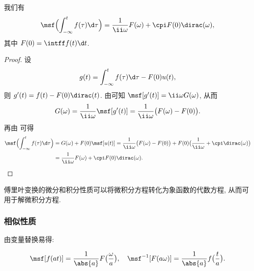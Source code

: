 \begin{theorem}[积分性质]
  \label{thm:fourier-integral-property}
  我们有
  \[
    \msf\Bigl(\int_{-\infty}^t f(\tau)\d\tau\Bigr)
    =\frac1{\ii \omega}F(\omega)+\cpi F(0)\dirac(\omega),
  \]
  其中 $F(0)=\intff f(t)\d t$.
\end{theorem}

\begin{proof}
  设
  \[
    g(t)=\int_{-\infty}^t f(\tau)\d \tau-F(0)u(t),
  \]
  则 $g'(t)=f(t)-F(0)\dirac(t)$.
  由\thmFDif 可知 $\msf[g'(t)]=\ii \omega G(\omega)$, 从而
  \[
    G(\omega)=\frac1{\ii \omega}\msf[g'(t)]
    =\frac1{\ii \omega}\bigl(F(\omega)-F(0)\bigr).
  \]
  再由 可得
  \begin{align*}
    \msf\Bigl(\int_{-\infty}^t f(\tau)\d\tau\Bigr)
    &=G(\omega)+F(0)\msf[u(t)]
    =\frac1{\ii \omega}\bigl(F(\omega)-F(0)\bigr)+F(0)\bigl(\frac1{\ii \omega}+\cpi\dirac(\omega)\bigr)\\
    &=\frac1{\ii \omega}F(\omega)+\cpi F(0)\dirac(\omega).\qedhere
  \end{align*}
\end{proof}

傅里叶变换的微分和积分性质可以将微积分方程转化为象函数的代数方程, 从而可用于解微积分方程.


\subsubsection{相似性质}

由变量替换易得:
\begin{theorem}[相似性质]
  \label{thm:fourier-similar-property}
  \[
    \msf[f(at)]=\frac1{\abs{a}}F\bigl(\frac\omega a\bigr),\quad
    \msf^{-1}[F(a\omega)]=\frac1{\abs{a}}f\bigl(\frac t a\bigr).
  \]
\end{theorem}

